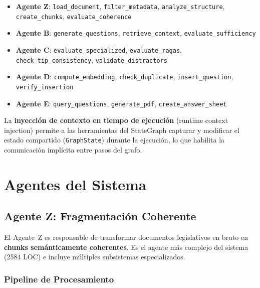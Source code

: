 \documentclass[10pt,twocolumn,letterpaper]{article}
\begin{document}
\begin{itemize}[nosep,leftmargin=*]
  \item \textbf{Agente Z}: \texttt{load\_document}, \texttt{filter\_metadata},
        \texttt{analyze\_structure}, \texttt{create\_chunks}, \texttt{evaluate\_coherence}
  \item \textbf{Agente B}: \texttt{generate\_questions}, \texttt{retrieve\_context},
        \texttt{evaluate\_sufficiency}
  \item \textbf{Agente C}: \texttt{evaluate\_specialized}, \texttt{evaluate\_ragas},
        \texttt{check\_tip\_consistency}, \texttt{validate\_distractors}
  \item \textbf{Agente D}: \texttt{compute\_embedding}, \texttt{check\_duplicate},
        \texttt{insert\_question}, \texttt{verify\_insertion}
  \item \textbf{Agente E}: \texttt{query\_questions}, \texttt{generate\_pdf},
        \texttt{create\_answer\_sheet}
\end{itemize}

La \textbf{inyecci\'on de contexto en tiempo de ejecuci\'on} (runtime context injection)
permite a las herramientas del StateGraph capturar
y modificar el estado compartido (\texttt{GraphState}) durante la ejecuci\'on, lo que
habilita la comunicaci\'on impl\'icita entre pasos del grafo.

\section{Agentes del Sistema}

\subsection{Agente Z: Fragmentaci\'on Coherente}

El Agente~Z es responsable de transformar documentos legislativos en bruto en
\textbf{chunks sem\'anticamente coherentes}. Es el agente m\'as complejo del sistema
(2584 LOC) e incluye m\'ultiples subsistemas especializados.

\subsubsection{Pipeline de Procesamiento}
\end{document}
